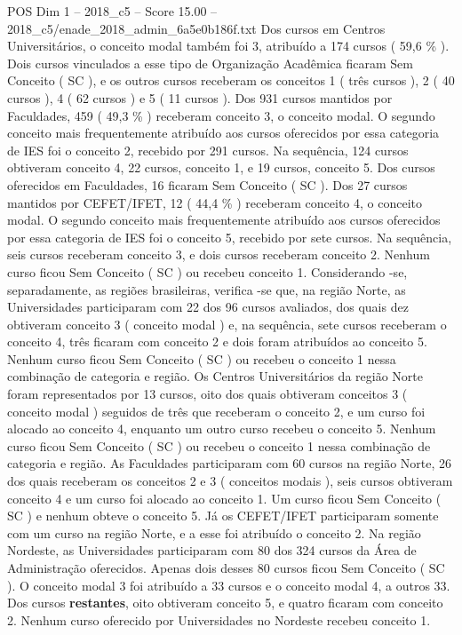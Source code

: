 \begin{textsample}{POS Dim 1 – 2018\_c5 – Score 15.00 – 2018\_c5/enade\_2018\_admin\_6a5e0b186f.txt}
Dos cursos em Centros Universitários, o conceito modal também foi 3, atribuído a 174 cursos ( 59,6 \% ).
Dois cursos vinculados a esse tipo de Organização Acadêmica ficaram Sem Conceito ( SC ), e os outros cursos receberam os conceitos 1 ( três cursos ), 2 ( 40 cursos ), 4 ( 62 cursos ) e 5 ( 11 cursos ).
Dos 931 cursos mantidos por Faculdades, 459 ( 49,3 \% ) receberam conceito 3, o conceito modal.
O segundo conceito mais frequentemente atribuído aos cursos oferecidos por essa categoria de IES foi o conceito 2, recebido por 291 cursos.
Na sequência, 124 cursos obtiveram conceito 4, 22 cursos, conceito 1, e 19 cursos, conceito 5.
Dos cursos oferecidos em Faculdades, 16 ficaram Sem Conceito ( SC ).
Dos 27 cursos mantidos por CEFET/IFET, 12 ( 44,4 \% ) receberam conceito 4, o conceito modal.
O segundo conceito mais frequentemente atribuído aos cursos oferecidos por essa categoria de IES foi o conceito 5, recebido por sete cursos.
Na sequência, seis cursos receberam conceito 3, e dois cursos receberam conceito 2.
Nenhum curso ficou Sem Conceito ( SC ) ou recebeu conceito 1.
Considerando -se, separadamente, as regiões brasileiras, verifica -se que, na região Norte, as Universidades participaram com 22 dos 96 cursos avaliados, dos quais dez obtiveram conceito 3 ( conceito modal ) e, na sequência, sete cursos receberam o conceito 4, três ficaram com conceito 2 e dois foram atribuídos ao conceito 5.
Nenhum curso ficou Sem Conceito ( SC ) ou recebeu o conceito 1 nessa combinação de categoria e região.
Os Centros Universitários da região Norte foram representados por 13 cursos, oito dos quais obtiveram conceitos 3 ( conceito modal ) seguidos de três que receberam o conceito 2, e um curso foi alocado ao conceito 4, enquanto um outro curso recebeu o conceito 5.
Nenhum curso ficou Sem Conceito ( SC ) ou recebeu o conceito 1 nessa combinação de categoria e região.
As Faculdades participaram com 60 cursos na região Norte, 26 dos quais receberam os conceitos 2 e 3 ( conceitos modais ), seis cursos obtiveram conceito 4 e um curso foi alocado ao conceito 1.
Um curso ficou Sem Conceito ( SC ) e nenhum obteve o conceito 5.
Já os CEFET/IFET participaram somente com um curso na região Norte, e a esse foi atribuído o conceito 2.
Na região Nordeste, as Universidades participaram com 80 dos 324 cursos da Área de Administração oferecidos.
Apenas dois desses 80 cursos ficou Sem Conceito ( SC ).
O conceito modal 3 foi atribuído a 33 cursos e o conceito modal 4, a outros 33.
Dos cursos \textbf{restantes}, oito obtiveram conceito 5, e quatro ficaram com conceito 2.
Nenhum curso oferecido por Universidades no Nordeste recebeu conceito 1.

\end{textsample}
